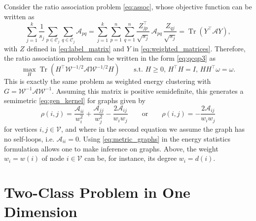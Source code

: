 \documentclass[aps,preprint,nofootinbib,floatfix]{revtex4-1}
\DeclareMathOperator{\Tr}{Tr}
\newcommand\C{{\mathcal{C}}}
\newcommand\om{\omega}
\begin{document}
Consider the ratio association problem \eqref{eq:assoc}, 
whose objective function can be written as
\begin{equation}
\sum_{j=1}^k \dfrac{1}{s_j} \sum_{p \in \C_j} \sum_{q \in \C_j}
\mathcal{A}_{pq} = \sum_{j=1}^k \sum_{p=1}^n \sum_{q=1}^n 
\dfrac{Z^\top_{jp}}{\sqrt{s_j}} \, \mathcal{A}_{pq} \, 
\dfrac{Z_{qj}}{\sqrt{s_j}}
= \Tr\left( Y^\top \mathcal{A} Y \right) ,
\end{equation}
with $Z$ defined in \eqref{eq:label_matrix} and $Y$ in
\eqref{eq:weighted_matrices}. Therefore, the ratio association problem
can be written in the form \eqref{eq:qcqp3} as
\begin{equation}
\max_H \Tr\left( H^\top \mathcal{W}^{-1/2} \mathcal{A} \mathcal{W}^{-1/2} H 
\right) \qquad \mbox{s.t. $H\ge 0$, $H^\top H = I$, $H H^\top
\om=\om$}.
\end{equation}
This is exactly the same problem as weighted energy 
clustering with 
$G = \mathcal{W}^{-1} \mathcal{A} \mathcal{W}^{-1}$. Assuming this
matrix is positive semidefinite, this generates a semimetric
\eqref{eq:gen_kernel} for graphs given by
\begin{equation}
\label{eq:metric_graphs}
\rho(i,j) = 
\dfrac{\mathcal{A}_{ii}}{w_i^{2}}
+\dfrac{\mathcal{A}_{jj}}{w_j^{2}}
-\dfrac{2 \mathcal{A}_{ij}}{w_i w_j} \qquad\mbox{or}\qquad
\rho(i,j) = -\dfrac{2 \mathcal{A}_{ij}}{w_i w_j}
\end{equation}
for vertices $i,j \in \mathcal{V}$, and 
where in the second equation we assume the graph has no self-loops,
i.e. $\mathcal{A}_{ii} = 0$. 
Using \eqref{eq:metric_graphs} 
in the energy statistics formulation 
allows one to make inference
on graphs.
Above, the weight $w_i = w(i)$ of node $i\in \mathcal{V}$ can be, for instance,
its degree $w_i = d(i)$.


\section{Two-Class Problem in One Dimension}
\label{sec:twoclass}

\end{document}
